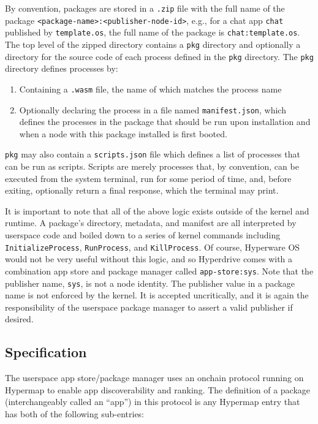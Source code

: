 \documentclass[runningheads]{llncs}
\begin{document}
By convention, packages are stored in a \verb|.zip| file with the full name of the package \verb|<package-name>:<publisher-node-id>|, e.g., for a chat app \verb|chat| published by \verb|template.os|, the full name of the package is \verb|chat:template.os|.
The top level of the zipped directory contains a \verb|pkg| directory and optionally a directory for the source code of each process defined in the \verb|pkg| directory.
The \verb|pkg| directory defines processes by:
\begin{enumerate}
    \item Containing a \verb|.wasm| file, the name of which matches the process name
    \item Optionally declaring the process in a file named \verb|manifest.json|, which defines the processes in the package that should be run upon installation and when a node with this package installed is first booted.
\end{enumerate}

\verb|pkg| may also contain a \verb|scripts.json| file which defines a list of processes that can be run as scripts.
Scripts are merely processes that, by convention, can be executed from the system terminal, run for some period of time, and, before exiting, optionally return a final response, which the terminal may print.

It is important to note that all of the above logic exists outside of the kernel and runtime.
A package's directory, metadata, and manifest are all interpreted by userspace code and boiled down to a series of kernel commands including \verb|InitializeProcess|, \verb|RunProcess|, and \verb|KillProcess|.
Of course, Hyperware OS would not be very useful without this logic, and so Hyperdrive comes with a combination app store and package manager called \verb|app-store:sys|.
Note that the publisher name, \verb|sys|, is not a node identity.
The publisher value in a package name is not enforced by the kernel.
It is accepted uncritically, and it is again the responsibility of the userspace package manager to assert a valid publisher if desired.

\subsection{Specification}
\label{sec:packagemanagerspec}

The userspace app store/package manager uses an onchain protocol running on Hypermap to enable app discoverability and ranking.
The definition of a package (interchangeably called an ``app'') in this protocol is any Hypermap entry that has both of the following sub-entries:
\end{document}
